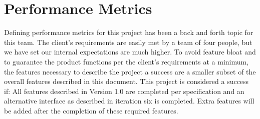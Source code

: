 		\section{Performance Metrics}
		Defining performance metrics for this project has been a back and forth topic for this team. The client's requirements are easily met by a team of four people, but we have set our internal expectations are much higher. To avoid feature bloat and to guarantee the product functions per the client's requirements at a minimum, the features necessary to describe the project a success are a smaller subset of the overall features described in this document. This project is considered a success if: All features described in Version 1.0 are completed per specification and an alternative interface as described in iteration six is completed. Extra features will be added after the completion of these required
		features.
